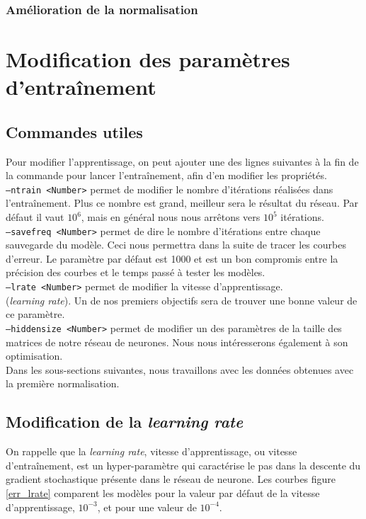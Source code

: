 \documentclass{article}
\begin{document}
\subsubsection{Amélioration de la normalisation}





\section{Modification des paramètres d'entraînement}

\subsection{Commandes utiles}

Pour modifier l'apprentissage, on peut ajouter une des lignes suivantes à la fin de la commande pour lancer l'entraînement, afin d'en modifier les propriétés. \\
\noindent \texttt{--ntrain <Number>} permet de modifier le nombre d'itérations réalisées dans l'entraînement. Plus ce nombre est grand, meilleur sera le résultat du réseau. Par défaut il vaut $10^6$, mais en général nous nous arrêtons vers $10^5$ itérations.\\
\texttt{--savefreq <Number>} permet de dire le nombre d'itérations entre chaque sauvegarde du modèle. Ceci nous permettra dans la suite de tracer les courbes d'erreur. Le paramètre par défaut est 1000 et est un bon compromis entre la précision des courbes et le temps passé à tester les modèles. \\
\texttt{--lrate <Number>} permet de modifier la vitesse d'apprentissage. \\ (\textit{learning rate}). Un de nos premiers objectifs sera de trouver une bonne valeur de ce paramètre. \\
\texttt{--hiddensize <Number>} permet de modifier un des paramètres de la taille des matrices de notre réseau de neurones. Nous nous intéresserons également à son optimisation. \\

Dans les sous-sections suivantes, nous travaillons avec les données obtenues avec la première normalisation.

\subsection{Modification de la \textit{learning rate}}

On rappelle que la \textit{learning rate}, vitesse d'apprentissage, ou vitesse d'entraînement, est un hyper-paramètre qui caractérise le pas dans la descente du gradient stochastique présente dans le réseau de neurone. Les courbes figure \ref{err_lrate} comparent les modèles pour la valeur par défaut de la vitesse d'apprentissage, $10^{-3}$, et pour une valeur de $10^{-4}$. 
\end{document}
